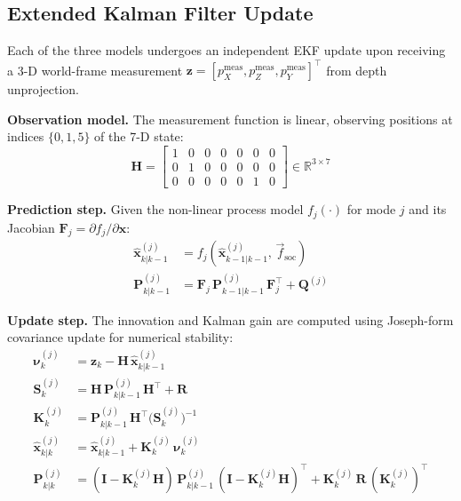 \documentclass[conference]{IEEEtran}
\begin{document}
\subsection{Extended Kalman Filter Update}
\label{sec:ekf}

Each of the three models undergoes an independent EKF update upon receiving a 3-D world-frame measurement $\mathbf{z} = [p_X^{\text{meas}}, p_Z^{\text{meas}}, p_Y^{\text{meas}}]^\top$ from depth unprojection.

\textbf{Observation model.} The measurement function is linear, observing positions at indices $\{0, 1, 5\}$ of the 7-D state:
\begin{equation}
\mathbf{H} = \begin{bmatrix}
1 & 0 & 0 & 0 & 0 & 0 & 0 \\
0 & 1 & 0 & 0 & 0 & 0 & 0 \\
0 & 0 & 0 & 0 & 0 & 1 & 0
\end{bmatrix} \in \mathbb{R}^{3 \times 7}
\end{equation}

\textbf{Prediction step.} Given the non-linear process model $f_j(\cdot)$ for mode $j$ and its Jacobian $\mathbf{F}_j = \partial f_j / \partial \mathbf{x}$:
\begin{align}
\hat{\mathbf{x}}_{k|k-1}^{(j)} &= f_j\!\left(\hat{\mathbf{x}}_{k-1|k-1}^{(j)},\, \vec{f}_{\text{soc}}\right) \label{eq:ekf_pred_mean} \\
\mathbf{P}_{k|k-1}^{(j)} &= \mathbf{F}_j \, \mathbf{P}_{k-1|k-1}^{(j)} \, \mathbf{F}_j^\top + \mathbf{Q}^{(j)} \label{eq:ekf_pred_cov}
\end{align}

\textbf{Update step.} The innovation and Kalman gain are computed using Joseph-form covariance update for numerical stability:
\begin{align}
\bm{\nu}_k^{(j)} &= \mathbf{z}_k - \mathbf{H}\,\hat{\mathbf{x}}_{k|k-1}^{(j)} \label{eq:innov} \\
\mathbf{S}_k^{(j)} &= \mathbf{H}\,\mathbf{P}_{k|k-1}^{(j)}\,\mathbf{H}^\top + \mathbf{R} \label{eq:inncov} \\
\mathbf{K}_k^{(j)} &= \mathbf{P}_{k|k-1}^{(j)}\,\mathbf{H}^\top \bigl(\mathbf{S}_k^{(j)}\bigr)^{-1} \label{eq:gain} \\
\hat{\mathbf{x}}_{k|k}^{(j)} &= \hat{\mathbf{x}}_{k|k-1}^{(j)} + \mathbf{K}_k^{(j)}\,\bm{\nu}_k^{(j)} \label{eq:upd_mean} \\
\mathbf{P}_{k|k}^{(j)} &= (\mathbf{I} - \mathbf{K}_k^{(j)} \mathbf{H})\,\mathbf{P}_{k|k-1}^{(j)}\,(\mathbf{I} - \mathbf{K}_k^{(j)} \mathbf{H})^\top + \mathbf{K}_k^{(j)}\,\mathbf{R}\,(\mathbf{K}_k^{(j)})^\top \label{eq:upd_cov}
\end{align}
\end{document}
